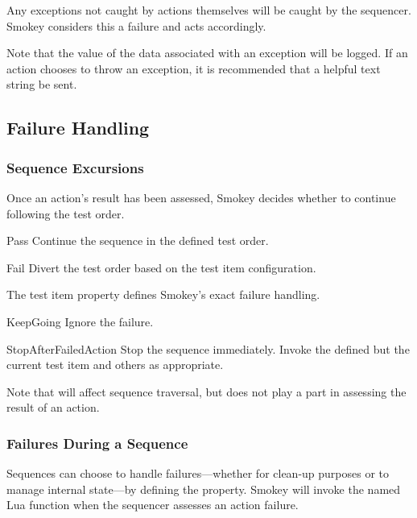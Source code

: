 Any exceptions not caught by actions themselves will be caught by the
sequencer.  Smokey considers this a failure and acts accordingly.

Note that the value of the data associated with an exception will be logged.
If an action chooses to throw an exception, it is recommended that a helpful
text string be sent.

\subsection{Failure Handling}

\subsubsection{Sequence Excursions}

Once an action's result has been assessed, Smokey decides whether to continue
following the test order.

\begin{Definition}

\item[Pass] Continue the sequence in the defined test order.

\item[Fail] Divert the test order based on the test item configuration.

\end{Definition}

The test item property  defines Smokey's exact failure
handling.

\begin{Definition}

\item[KeepGoing] Ignore the failure.

\item[StopAfterFailedAction] Stop the sequence immediately.  Invoke the
 defined but the current test item and others as appropriate.

\end{Definition}

Note that  will affect sequence traversal, but does not
play a part in assessing the result of an action.

\subsubsection{Failures During a Sequence}

Sequences can choose to handle failures---whether for clean-up purposes or to
manage internal state---by defining the  property.  Smokey
will invoke the named Lua function when the sequencer assesses an action
failure.

